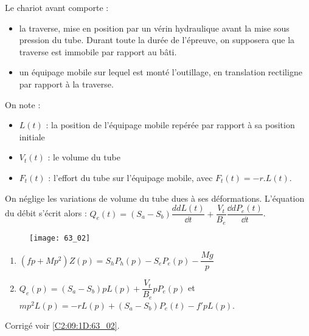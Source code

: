\ifprof
\else
\fi


Le chariot avant comporte  :
\begin{itemize}
\item la traverse, mise en position par un vérin hydraulique avant la mise sous pression du tube. Durant toute la durée de l’épreuve, on supposera que la traverse est immobile par rapport au bâti.
\item un équipage mobile sur lequel est monté l’outillage, en translation rectiligne par rapport à la traverse.
\end{itemize}


On note :
\begin{itemize}
\item $L(t)$ : la position de l’équipage mobile repérée par rapport à sa position initiale
\item $V_t(t)$ : le volume du tube
\item $F_t(t)$ : l’effort du tube sur l’équipage mobile, avec $F_t(t) = - r.L(t)$.
\end{itemize}
On néglige les variations de volume du tube dues à ses déformations. L’équation du débit s’écrit alors :
$Q_e (t)=(S_a-S_b ) \dfrac{dd L(t)}{\dd t}+\dfrac{V_t}{B_e}\dfrac{\dd dP_e (t)}{\dd t}$.

\ifprof
\else
\fi



\begin{figure}[H]
\centering
\texttt{[image: 63\_02]}
\end{figure}


\ifprof

\else
\footnotesize
\begin{enumerate}
  \item $\left(fp + Mp^2\right) Z(p)=S_h P_h(p)-S_e P_e(p) - \dfrac{Mg}{p}$
    \item $Q_e(p)=\left(S_a - S_b \right)pL(p) + \dfrac{V_t}{B_e} p P_e(p)$ et $mp^2 L(p) = -rL(p)+\left(S_a-S_b\right) P_e(t)-f'pL(p)$.
\end{enumerate}
\normalsize

\begin{flushright}
\footnotesize{Corrigé  voir \ref{C2:09:1D:63_02}.}
\end{flushright}%
\fi